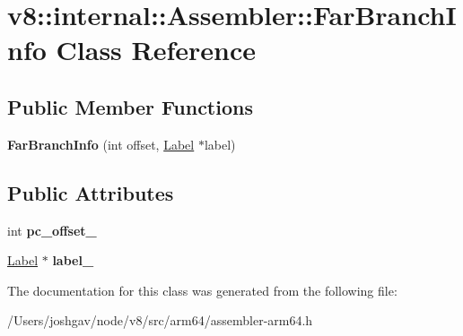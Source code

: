 \hypertarget{classv8_1_1internal_1_1_assembler_1_1_far_branch_info}{}\section{v8\+:\+:internal\+:\+:Assembler\+:\+:Far\+Branch\+Info Class Reference}
\label{classv8_1_1internal_1_1_assembler_1_1_far_branch_info}
\subsection*{Public Member Functions}
\begin{DoxyCompactItemize}
\item 
{\bfseries Far\+Branch\+Info} (int offset, \hyperlink{classv8_1_1internal_1_1_label}{Label} $\ast$label)\hypertarget{classv8_1_1internal_1_1_assembler_1_1_far_branch_info_adef504b379b0f0bbedb03c63f908b13d}{}\label{classv8_1_1internal_1_1_assembler_1_1_far_branch_info_adef504b379b0f0bbedb03c63f908b13d}

\end{DoxyCompactItemize}
\subsection*{Public Attributes}
\begin{DoxyCompactItemize}
\item 
int {\bfseries pc\+\_\+offset\+\_\+}\hypertarget{classv8_1_1internal_1_1_assembler_1_1_far_branch_info_a0979e2ec5fa8ea1085dfe292662c63bc}{}\label{classv8_1_1internal_1_1_assembler_1_1_far_branch_info_a0979e2ec5fa8ea1085dfe292662c63bc}

\item 
\hyperlink{classv8_1_1internal_1_1_label}{Label} $\ast$ {\bfseries label\+\_\+}\hypertarget{classv8_1_1internal_1_1_assembler_1_1_far_branch_info_ad4ab8af8b7eefa485b2bdeab89ae5ab2}{}\label{classv8_1_1internal_1_1_assembler_1_1_far_branch_info_ad4ab8af8b7eefa485b2bdeab89ae5ab2}

\end{DoxyCompactItemize}


The documentation for this class was generated from the following file\+:\begin{DoxyCompactItemize}
\item 
/\+Users/joshgav/node/v8/src/arm64/assembler-\/arm64.\+h\end{DoxyCompactItemize}

